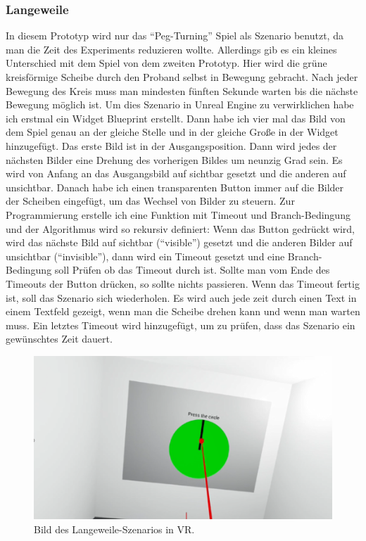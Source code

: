 \subsubsection{Langeweile} \label{langeweile-4}





In diesem Prototyp wird nur das ``Peg-Turning'' Spiel als Szenario benutzt, da man die Zeit des Experiments reduzieren wollte. Allerdings gib es ein kleines Unterschied mit dem Spiel von dem zweiten Prototyp. Hier wird die gr{\"u}ne kreisf{\"o}rmige Scheibe durch den Proband selbst in Bewegung gebracht. Nach jeder Bewegung des Kreis muss man mindesten f{\"u}nften Sekunde warten bis die n{\"a}chste Bewegung m{\"o}glich ist. 
 Um dies Szenario in Unreal Engine zu verwirklichen habe ich erstmal ein Widget Blueprint erstellt. Dann habe ich vier mal das Bild von dem Spiel genau an der gleiche Stelle und in der gleiche Gro{\ss}e in der Widget hinzugef{\"u}gt. Das erste Bild ist in der Ausgangsposition. Dann wird jedes der n{\"a}chsten Bilder eine Drehung des vorherigen Bildes um neunzig Grad sein. Es wird von Anfang an das Ausgangsbild auf sichtbar gesetzt und die anderen auf unsichtbar. Danach habe ich einen transparenten Button immer auf die Bilder der Scheiben eingef{\"u}gt, um das Wechsel von Bilder zu steuern. Zur Programmierung erstelle ich eine Funktion mit Timeout und Branch-Bedingung und der Algorithmus wird so rekursiv definiert:  Wenn das Button gedr{\"u}ckt wird, wird das n{\"a}chste Bild auf sichtbar (``visible'') gesetzt und die anderen Bilder auf unsichtbar (``invisible''), dann wird ein Timeout gesetzt und eine Branch-Bedingung soll Pr{\"u}fen ob das Timeout durch ist. Sollte man vom Ende des Timeouts der Button dr{\"u}cken, so sollte nichts passieren. Wenn das Timeout fertig ist, soll das Szenario sich wiederholen. Es wird auch jede zeit durch einen Text in einem Textfeld gezeigt, wenn man die Scheibe drehen kann und wenn man warten muss. Ein letztes Timeout wird hinzugef{\"u}gt, um zu pr{\"u}fen, dass das Szenario ein gew{\"u}nschtes Zeit dauert. \\


\begin{figure}[H] \centering
\includegraphics[width=\textwidth]{Images/Boredom.png} 
\caption{ Bild des Langeweile-Szenarios in VR. }
\label{fig:boredom4} 
\end{figure}

